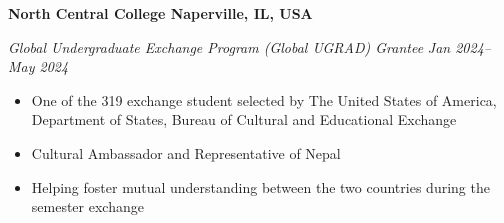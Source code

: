 \textbf{North Central College \hfill Naperville, IL, USA} \par
\textit{Global Undergraduate Exchange Program (Global UGRAD) Grantee} \hfill \textit{Jan 2024--May 2024} \par
\begin{itemize}
	\item One of the 319 exchange student selected by The United States of America, Department of States, Bureau of Cultural and Educational Exchange
	\item Cultural Ambassador and Representative of Nepal
    \item Helping foster mutual understanding between the two countries during the semester exchange
\end{itemize}\par